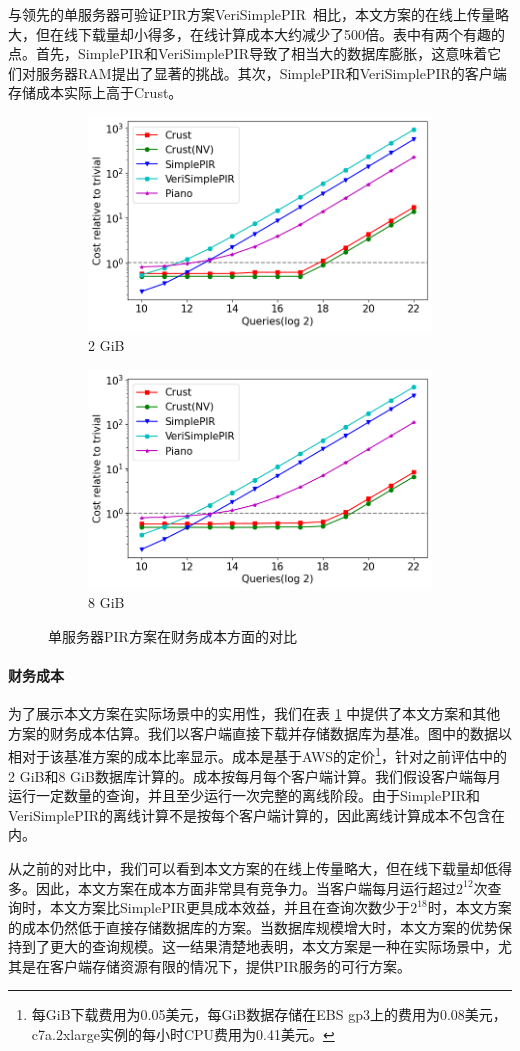 与领先的单服务器可验证PIR方案VeriSimplePIR~\cite{VeriSimplePIR}相比，本文方案的在线上传量略大，但在线下载量却小得多，在线计算成本大约减少了500倍。表中有两个有趣的点。首先，SimplePIR和VeriSimplePIR导致了相当大的数据库膨胀，这意味着它们对服务器RAM提出了显著的挑战。其次，SimplePIR和VeriSimplePIR的客户端存储成本实际上高于Crust。

\begin{figure}
    \begin{subfigure}{0.5\textwidth}
        \centering
        \includegraphics[width=0.8\linewidth]{figure/cost_2gb.png}
        \caption{2 GiB}
    \end{subfigure}%
    \begin{subfigure}{0.5\textwidth}
        \centering
        \includegraphics[width=0.8\linewidth]{figure/cost_8gb.png}
        \caption{8 GiB}
    \end{subfigure}%
    \caption{单服务器PIR方案在财务成本方面的对比}
    \label{fig:single-server-cost}
\end{figure}

\paragraph{财务成本}
为了展示本文方案在实际场景中的实用性，我们在表 \ref{fig:single-server-cost} 中提供了本文方案和其他方案的财务成本估算。我们以客户端直接下载并存储数据库为基准。图中的数据以相对于该基准方案的成本比率显示。成本是基于AWS的定价\footnote{每GiB下载费用为0.05美元，每GiB数据存储在EBS gp3上的费用为0.08美元，c7a.2xlarge实例的每小时CPU费用为0.41美元。}，针对之前评估中的2 GiB和8 GiB数据库计算的。成本按每月每个客户端计算。我们假设客户端每月运行一定数量的查询，并且至少运行一次完整的离线阶段。由于SimplePIR和VeriSimplePIR的离线计算不是按每个客户端计算的，因此离线计算成本不包含在内。

从之前的对比中，我们可以看到本文方案的在线上传量略大，但在线下载量却低得多。因此，本文方案在成本方面非常具有竞争力。当客户端每月运行超过$2^{12}$次查询时，本文方案比SimplePIR更具成本效益，并且在查询次数少于$2^{18}$时，本文方案的成本仍然低于直接存储数据库的方案。当数据库规模增大时，本文方案的优势保持到了更大的查询规模。这一结果清楚地表明，本文方案是一种在实际场景中，尤其是在客户端存储资源有限的情况下，提供PIR服务的可行方案。